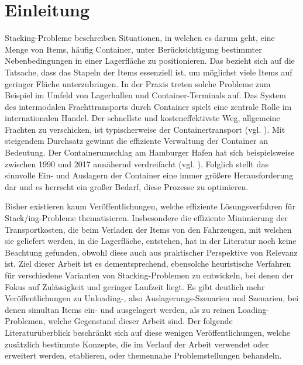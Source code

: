 \section{Einleitung}
\label{sec:einleitung}

Stacking-Probleme beschreiben Situationen, in welchen es darum geht, eine Menge von Items, häufig Container,
unter Berücksichtigung bestimmter Nebenbedingungen in einer Lagerfläche zu positionieren. Das 
bezieht sich auf die Tatsache, dass das Stapeln der Items essenziell ist, um möglichst viele Items
auf geringer Fläche unterzubringen. In der Praxis treten solche Probleme zum Beispiel im Umfeld von Lagerhallen
und Container-Terminals auf.\newline
Das System des intermodalen Frachttransports durch Container spielt eine zentrale Rolle im internationalen Handel.
Der schnellste und kosteneffektivste Weg, allgemeine Frachten zu verschicken, ist typischerweise der
Containertransport (vgl. \citet{Briskorn2018}).
Mit steigendem Durchsatz gewinnt die effiziente Verwaltung der Container an Bedeutung.
Der Containerumschlag am Hamburger Hafen hat sich beispielsweise zwischen 1990 und 2017
annähernd verdreifacht (vgl. \citet{Port_of_Hamburg}).
Folglich stellt das sinnvolle Ein- und Auslagern der Container eine immer größere Herausforderung dar und
es herrscht ein großer Bedarf, diese Prozesse zu optimieren.

Bisher existieren kaum Veröffentlichungen, welche effiziente Lösungsverfahren für Stack\-/ing-Probleme thematisieren.
Insbesondere die effiziente Minimierung der Transportkosten, die beim Verladen der Items von den Fahrzeugen,
mit welchen sie geliefert werden, in die Lagerfläche, entstehen, hat in der Literatur noch keine Beachtung gefunden,
obwohl diese auch aus praktischer Perspektive von Relevanz ist. Ziel dieser Arbeit ist es dementsprechend,
ebensolche heuristische Verfahren für verschiedene Varianten von Stacking-Problemen zu entwickeln, bei denen der Fokus auf
Zulässigkeit und geringer Laufzeit liegt.\newline
Es gibt deutlich mehr Veröffentlichungen zu Unloading-, also Auslagerungs-Szenarien und Szenarien, bei denen simultan Items
ein- und ausgelagert werden, als zu reinen Loading-Problemen, welche Gegenstand dieser Arbeit sind.
Der folgende Literaturüberblick beschränkt sich auf diese wenigen Veröffentlichungen, welche zusätzlich bestimmte Konzepte,
die im Verlauf der Arbeit verwendet oder erweitert werden, etablieren, oder themennahe Problemstellungen behandeln.


